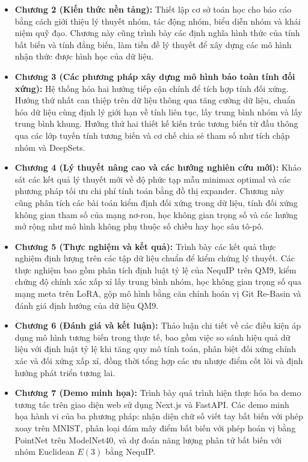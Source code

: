\begin{itemize}
    \item \textbf{Chương 2 (Kiến thức nền tảng):} Thiết lập cơ sở toán học cho báo cáo bằng cách giới thiệu lý thuyết nhóm, tác động nhóm, biểu diễn nhóm và khái niệm quỹ đạo. Chương này cũng trình bày các định nghĩa hình thức của tính bất biến và tính đẳng biến, làm tiền đề lý thuyết để xây dựng các mô hình nhận thức được hình học của dữ liệu.
    \item \textbf{Chương 3 (Các phương pháp xây dựng mô hình bảo toàn tính đối xứng):} Hệ thống hóa hai hướng tiếp cận chính để tích hợp tính đối xứng. Hướng thứ nhất can thiệp trên dữ liệu thông qua tăng cường dữ liệu, chuẩn hóa dữ liệu cùng định lý giới hạn về tính liên tục, lấy trung bình nhóm và lấy trung bình khung. Hướng thứ hai thiết kế kiến trúc tương biến từ đầu thông qua các lớp tuyến tính tương biến và cơ chế chia sẻ tham số như tích chập nhóm và DeepSets.
    \item \textbf{Chương 4 (Lý thuyết nâng cao và các hướng nghiên cứu mới):} Khảo sát các kết quả lý thuyết mới về độ phức tạp mẫu minimax optimal và các phương pháp tối ưu chi phí tính toán bằng đồ thị expander. Chương này cũng phân tích các bài toán kiểm định đối xứng trong dữ liệu, tính đối xứng không gian tham số của mạng nơ-ron, học không gian trọng số và các hướng mở rộng như mô hình không phụ thuộc số chiều hay học sâu tô-pô.
    \item \textbf{Chương 5 (Thực nghiệm và kết quả):} Trình bày các kết quả thực nghiệm định lượng trên các tập dữ liệu chuẩn để kiểm chứng lý thuyết. Các thực nghiệm bao gồm phân tích định luật tỷ lệ của NequIP trên QM9, kiểm chứng độ chính xác xấp xỉ lấy trung bình nhóm, học không gian trọng số qua mạng meta trên LoRA, gộp mô hình bằng căn chỉnh hoán vị Git Re-Basin và đánh giá định hướng của dữ liệu QM9.
    \item \textbf{Chương 6 (Đánh giá và kết luận):} Thảo luận chi tiết về các điều kiện áp dụng mô hình tương biến trong thực tế, bao gồm việc so sánh hiệu quả dữ liệu với định luật tỷ lệ khi tăng quy mô tính toán, phân biệt đối xứng chính xác và đối xứng xấp xỉ, đồng thời tổng hợp các ưu nhược điểm cốt lõi và định hướng phát triển tương lai.
    \item \textbf{Chương 7 (Demo minh họa):} Trình bày quá trình hiện thực hóa ba demo tương tác trên giao diện web sử dụng Next.js và FastAPI. Các demo minh họa hành vi của ba phương pháp: nhận diện chữ số viết tay bất biến với phép xoay trên MNIST, phân loại đám mây điểm bất biến với phép hoán vị bằng PointNet trên ModelNet40, và dự đoán năng lượng phân tử bất biến với nhóm Euclidean $E(3)$ bằng NequIP.
\end{itemize}

\clearpage